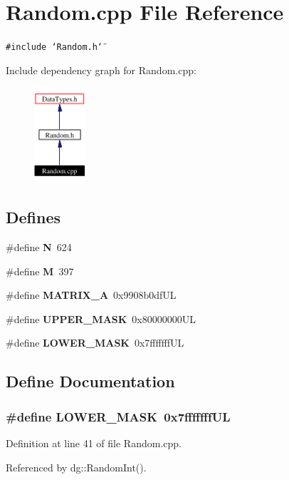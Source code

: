 \section{Random.cpp File Reference}
\label{Random_8cpp}
{\tt \#include \char`\"{}Random.h\char`\"{}}\par


Include dependency graph for Random.cpp:\begin{figure}[H]
\begin{center}
\leavevmode
\includegraphics[width=54pt]{Random_8cpp__incl}
\end{center}
\end{figure}
\subsection*{Defines}
\begin{CompactItemize}
\item 
\#define {\bf N}\ 624
\item 
\#define {\bf M}\ 397
\item 
\#define {\bf MATRIX\_\-A}\ 0x9908b0df\-UL
\item 
\#define {\bf UPPER\_\-MASK}\ 0x80000000UL
\item 
\#define {\bf LOWER\_\-MASK}\ 0x7fffffff\-UL
\end{CompactItemize}


\subsection{Define Documentation}
\subsubsection{\setlength{\rightskip}{0pt plus 5cm}\#define LOWER\_\-MASK\ 0x7fffffff\-UL}\label{Random_8cpp_a4}




Definition at line 41 of file Random.cpp.

Referenced by dg::Random\-Int().

